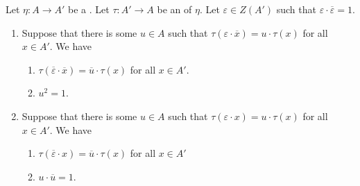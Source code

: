 \begin{lemma} \label{lemma:basic_facts_about_anti_symmetry_requirement_for_involution_trace_of_a_homomorphism_of_rings_with_involution}
   Let $\eta: A \to A'$ be a . Let $\tau: A' \to A$ be an  of $\eta$. Let $\varepsilon \in Z(A')$ such that $\varepsilon \cdot \overline{\varepsilon} = 1$. 

   \begin{enumerate}
    \item Suppose that there is some $u \in A$ such that $\tau(\varepsilon \cdot \overline{x}) = u \cdot \tau(x)$ for all $x \in A'$. We have
    \begin{enumerate}
        \item $\tau(\overline{\varepsilon} \cdot \overline{x}) = \overline{u} \cdot \tau(x)$ for all $x \in A'$. 
        \item $u^2 = 1$.
    \end{enumerate}

    \item Suppose that there is some $u \in A$ such that $\tau(\varepsilon \cdot x) = u \cdot \tau(x)$ for all $x \in A'$. We have
    \begin{enumerate}
        \item $\tau(\overline{\varepsilon} \cdot x) = \overline{u} \cdot \tau(x)$ for all $x \in A'$
        \item $u \cdot \overline{u} = 1$.  
    \end{enumerate}
   \end{enumerate}
\end{lemma}
